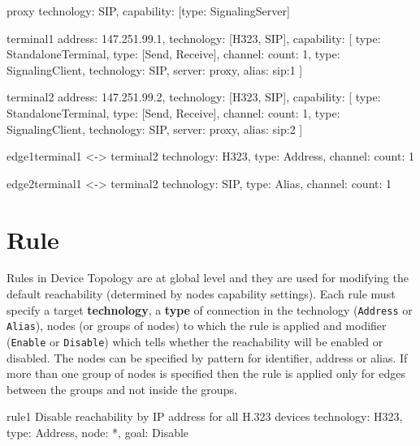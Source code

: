 \begin{TopologyExample}{proxy}{}
technology: SIP,
capability: [{type: SignalingServer}]
\end{TopologyExample}

\begin{TopologyExample}{terminal1}{}
address: 147.251.99.1,
technology: [H323, SIP],
capability: [
  {type: StandaloneTerminal},
  {type: [Send, Receive], channel: {count: 1}}, 
  {type: SignalingClient, technology: SIP, server: proxy, alias: sip:1}
]
\end{TopologyExample}

\begin{TopologyExample}{terminal2}{}
address: 147.251.99.2,
technology: [H323, SIP],
capability: [
  {type: StandaloneTerminal},
  {type: [Send, Receive], channel: {count: 1}}, 
  {type: SignalingClient, technology: SIP, server: proxy, alias: sip:2}
]
\end{TopologyExample}

\begin{TopologyExample}{edge1}{terminal1 <-> terminal2}
technology: H323,
type: Address,
channel: {count: 1}
\end{TopologyExample}

\begin{TopologyExample}{edge2}{terminal1 <-> terminal2}
technology: SIP,
type: Alias,
channel: {count: 1}
\end{TopologyExample} 
  
  
\section{Rule}
Rules in Device Topology are at global level and they are used for modifying 
the default reachability (determined by nodes capability settings). Each rule 
must specify a target \textbf{technology}, a \textbf{type} of connection in 
the technology (\verb|Address| or \verb|Alias|), nodes (or groups of nodes) 
to which the rule is applied and modifier (\verb|Enable| or \verb|Disable|) 
which tells whether the reachability will be enabled or disabled. The nodes 
can be specified by pattern for identifier, address or alias. If more than 
one group of nodes is specified then the rule is applied only for edges 
between the groups and not inside the groups.

\begin{TopologyExample}{rule1}
      {Disable reachability by IP address for all H.323 devices}
technology: H323,
type: Address,
node: *,
goal: Disable
\end{TopologyExample}

